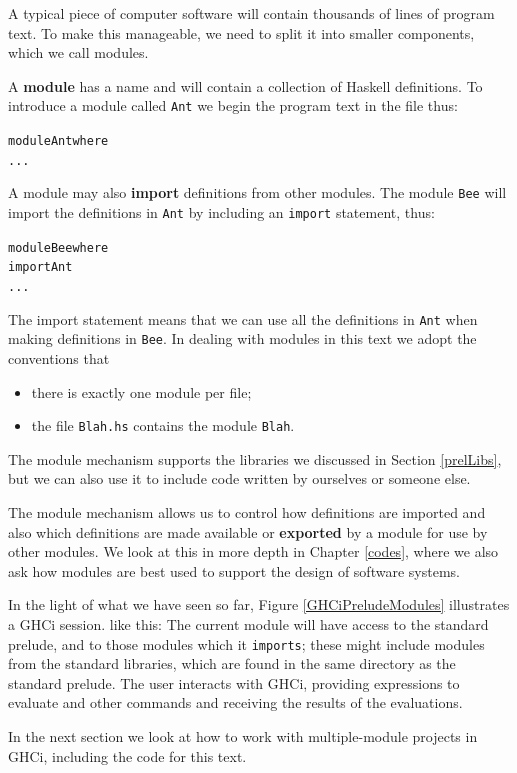 A typical piece of computer software will contain thousands of lines of
program text. To make this manageable, we need to split it into smaller
components,  which we call modules. 

A \textbf{module} has a name
and will
contain a collection of Haskell definitions. To introduce a module called \texttt{Ant}
we begin the program text in the file thus:
\begin{alltt}
module Ant where
   ...
\end{alltt}
A module may also
\textbf{import} definitions from other modules. The module \texttt{Bee}
will import the definitions in \texttt{Ant} by including an \texttt{import} statement,
thus:
\begin{alltt}

module Bee where
import Ant
   ...
\end{alltt}
The import statement means that we can use all the definitions in
\texttt{Ant} when making definitions in \texttt{Bee}.
In dealing with modules in this text
we adopt
the conventions that
\begin{itemize}
\item there is exactly one module per file;
\item the file \texttt{Blah.hs} contains the module
\texttt{Blah}.
\end{itemize}
The module mechanism supports the libraries we discussed in
Section \ref{prelLibs}, but we can also use it to include code written by 
ourselves or someone else. 

The module mechanism allows us to control how definitions are imported
and also which definitions are made available or \textbf{exported} by a
module for use by other modules. We look at this in more depth in Chapter \ref{codes}, where we
also ask how modules are best used to support the design of software
systems.

In the light of what we have seen so far, Figure \ref{GHCiPreludeModules} illustrates a GHCi session.
like this: 
The current module will have access to the standard prelude, and to
those modules which it \texttt{imports}; these might include modules
from the standard libraries, which are found in the same directory as the
standard prelude. The user interacts with GHCi, providing
expressions to evaluate and other commands and receiving the results of
the evaluations.

In the next section we look at how to work with multiple-module projects in GHCi, including the code for this text.

